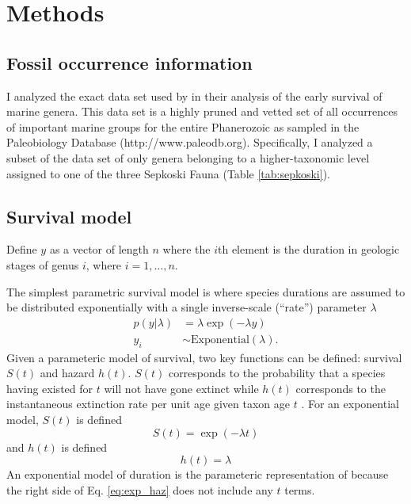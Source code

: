 \documentclass[12pt,letterpaper]{article}
\begin{document}
\section{Methods}

\subsection{Fossil occurrence information}
I analyzed the exact data set used by \citet{Foote2013} in their analysis of the early survival of marine genera. This data set is a highly pruned and vetted set of all occurrences of important marine groups for the entire Phanerozoic as sampled in the Paleobiology Database (http://www.paleodb.org). Specifically, I analyzed a subset of the \citet{Foote2013} data set of only genera belonging to a higher-taxonomic level assigned to one of the three Sepkoski Fauna (Table \ref{tab:sepkoski}).

\subsection{Survival model}
Define \(y\) as a vector of length \(n\) where the \(i\)th element is the duration in geologic stages of genus \(i\), where \(i = 1, \dots, n\).

The simplest parametric survival model is where species durations are assumed to be distributed exponentially with a single inverse-scale (``rate'') parameter \(\lambda\)
\begin{equation}
  \begin{aligned}
    p(y | \lambda) &= \lambda \exp(-\lambda y) \nonumber \\
    y_{i} &\sim \mathrm{Exponential}(\lambda).
  \end{aligned}
  \label{eq:exp}
\end{equation}
Given a parameteric model of survival, two key functions can be defined: survival \(S(t)\) and hazard \(h(t)\). \(S(t)\) corresponds to the probability that a species having existed for \(t\) will not have gone extinct while \(h(t)\) corresponds to the instantaneous extinction rate per unit age given taxon age \(t\) \citep{Klein2003}. For an exponential model, \(S(t)\) is defined
\begin{equation}
  S(t) = \exp(-\lambda t)
  \label{eq:exp_surv}
\end{equation}
and \(h(t)\) is defined
\begin{equation}
  h(t) = \lambda
  \label{eq:exp_haz}
\end{equation}
An exponential model of duration is the parameteric representation of \citet{VanValen1973} because the right side of Eq. \ref{eq:exp_haz} does not include any \(t\) terms.
\end{document}
